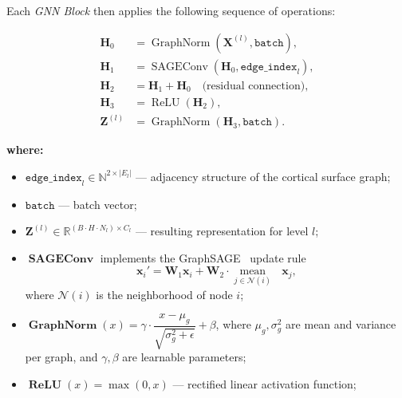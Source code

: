 \documentclass[FCD_GNN.tex]{subfiles}
\begin{document}
Each \textit{GNN Block} then applies the following sequence of operations:

\begin{align}
    \mathbf{H}_0 &= \operatorname{GraphNorm}\!\left(\mathbf{X}^{(l)}, \texttt{batch}\right), \\[4pt]
    \mathbf{H}_1 &= \operatorname{SAGEConv}\!\left(\mathbf{H}_0, \texttt{edge\_index}_l\right), \\[4pt]
    \mathbf{H}_2 &= \mathbf{H}_1 + \mathbf{H}_0 \quad \text{(residual connection)}, \\[4pt]
    \mathbf{H}_3 &= \operatorname{ReLU}\!\left(\mathbf{H}_2\right), \\[4pt]
    \mathbf{Z}^{(l)} &= \operatorname{GraphNorm}\!\left(\mathbf{H}_3, \texttt{batch}\right).
\end{align}

\noindent\textbf{where:}
\begin{itemize}
    \item $\texttt{edge\_index}_l \in \mathbb{N}^{2\times |E_l|}$ — adjacency structure of the cortical surface graph;
    \item $\texttt{batch}$ — batch vector;
    \item $\mathbf{Z}^{(l)} \in \mathbb{R}^{(B \cdot H \cdot N_l)\times C_l}$ — resulting representation for level $l$;
    \item $\operatorname{\textbf{SAGEConv}}$ implements the GraphSAGE~\cite{Hamilton2017GraphSAGE} update rule
    \[
    \mathbf{x}_i' = \mathbf{W}_1 \mathbf{x}_i + \mathbf{W}_2 \cdot \underset{j \in \mathcal{N}(i)}{\operatorname{mean}} \text{ } \mathbf{x}_j,
    \]
    where $\mathcal{N}(i)$ is the neighborhood of node $i$;
    \item $\operatorname{\textbf{GraphNorm}}(x) = \gamma \cdot \dfrac{x - \mu_g}{\sqrt{\sigma_g^2+\epsilon}} + \beta$, where $\mu_g, \sigma_g^2$ are mean and variance per graph, and $\gamma,\beta$ are learnable parameters;
    \item $\operatorname{\textbf{ReLU}}(x) = \max(0, x)$ — rectified linear activation function;
\end{itemize}
\end{document}
